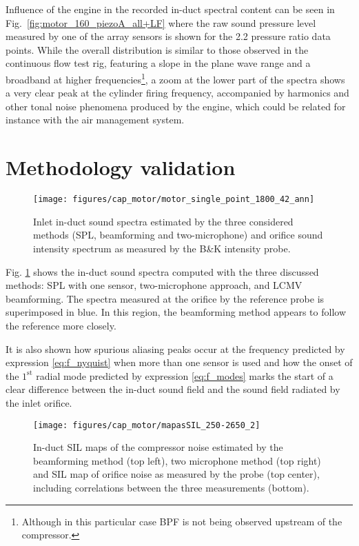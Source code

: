 Influence of the engine in the recorded in-duct spectral content can be seen in Fig.~\ref{fig:motor_160_piezoA_all+LF} where the raw sound pressure level measured by one of the array sensors is shown for the 2.2 pressure ratio data points. While the overall distribution is similar to those observed in the continuous flow test rig, featuring a slope in the plane wave range and a broadband at higher frequencies\footnote{Although in this particular case BPF is not being observed upstream of the compressor.}, a zoom at the lower part of the spectra shows a very clear peak at the cylinder firing frequency, accompanied by harmonics and other tonal noise phenomena produced by the engine, which could be related for instance with the air management system.

\section{Methodology validation}
\label{sec:motor_method_valid}

\begin{figure}[b!]
\centering
\texttt{[image: figures/cap\_motor/motor\_single\_point\_1800\_42\_ann]}
\caption[Comparison of selected method against intensity probe]{Inlet in-duct sound spectra estimated by the three considered methods (SPL, beamforming and two-microphone) and orifice sound intensity spectrum as measured by the B\&K intensity probe.}
\label{fig:espectros}
\end{figure}

Fig. \ref{fig:espectros} shows the in-duct sound spectra computed with the three discussed methods: SPL with one sensor, two-microphone approach, and LCMV beamforming. The spectra measured at the orifice by the reference probe is superimposed in blue. In this region, the beamforming method appears to follow the reference more closely.

It is also shown how spurious aliasing peaks occur at the frequency predicted by expression \ref{eq:f_nyquist} when more than one sensor is used and how the onset of the ${1}^\text{st}$ radial mode predicted by expression \ref{eq:f_modes} marks the start of a clear difference between the in-duct sound field and the sound field radiated by the inlet orifice.

\begin{figure*}[b!]
\hspace{-0.06\textwidth}
\texttt{[image: figures/cap\_motor/mapasSIL\_250-2650\_2]}
\caption[SIL maps by each method and their correlation]{In-duct SIL maps of the compressor noise estimated by the beamforming method (top left), two microphone method (top right) and SIL map of orifice noise as measured by the probe (top center), including correlations between the three measurements (bottom).}
\label{fig:mapasSIL_250-2650}
\end{figure*}

